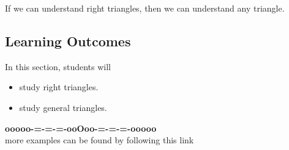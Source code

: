 \documentclass{ximera}
\begin{document}
If we can understand right triangles, then we can understand any triangle.










\subsection*{Learning Outcomes}


\begin{sectionOutcomes}
In this section, students will 

\begin{itemize}
\item study right triangles.
\item study general triangles.
\end{itemize}
\end{sectionOutcomes}













\begin{onlineOnly}
\begin{center}
\textbf{\textcolor{green!50!black}{ooooo-=-=-=-ooOoo-=-=-=-ooooo}} \\

more examples can be found by following this link\\ 

\end{center}
\end{onlineOnly}
\end{document}
